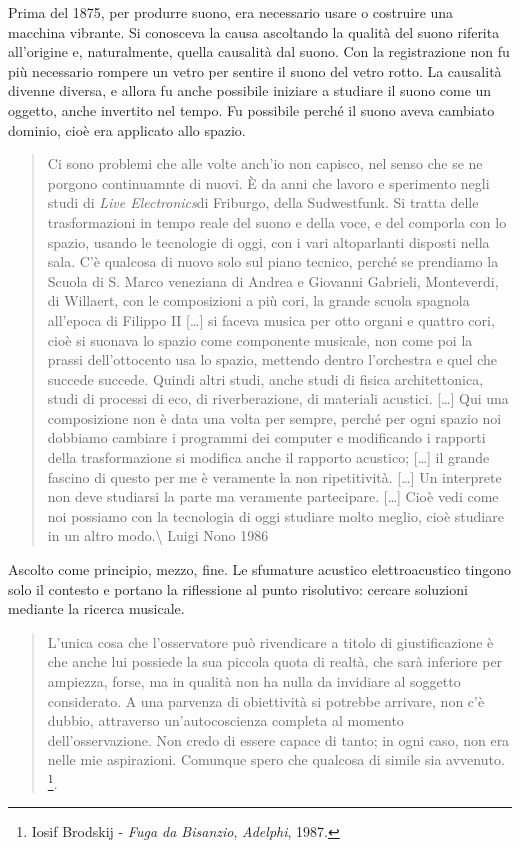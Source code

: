 \documentclass[a4paper,11pt]{article}
\begin{document}
Prima del 1875, per produrre suono, era necessario usare o costruire una
macchina vibrante. Si conosceva la causa ascoltando la qualità del suono
riferita all'origine e, naturalmente, quella causalità dal suono. Con la
registrazione non fu più necessario rompere un vetro per sentire il
suono del vetro rotto. La causalità divenne diversa, e allora fu anche
possibile iniziare a studiare il suono come un oggetto, anche invertito
nel tempo. Fu possibile perché il suono aveva cambiato dominio, cioè era
applicato allo spazio.

\begin{quote}
Ci sono problemi che alle volte anch'io non capisco, nel senso che se
ne porgono continuamnte di nuovi. È da anni che lavoro e sperimento
negli studi di \emph{Live Electronics}di Friburgo, della Sudwestfunk. Si
tratta delle trasformazioni in tempo reale del suono e della voce, e
del comporla con lo spazio, usando le tecnologie di oggi, con i vari
altoparlanti disposti nella sala. C'è qualcosa di nuovo solo sul piano
tecnico, perché se prendiamo la Scuola di S. Marco veneziana di Andrea
e Giovanni Gabrieli, Monteverdi, di Willaert, con le composizioni a
più cori, la grande scuola spagnola all'epoca di Filippo II {[}\ldots{}{]} si
faceva musica per otto organi e quattro cori, cioè si suonava lo
spazio come componente musicale, non come poi la prassi dell'ottocento
usa lo spazio, mettendo dentro l'orchestra e quel che succede succede.
Quindi altri studi, anche studi di fisica architettonica, studi di
processi di eco, di riverberazione, di materiali acustici. {[}\ldots{}{]} Qui
una composizione non è data una volta per sempre, perché per ogni
spazio noi dobbiamo cambiare i programmi dei computer e modificando i
rapporti della trasformazione si modifica anche il rapporto acustico;
{[}\ldots{}{]} il grande fascino di questo per me è veramente la non
ripetitività. {[}\ldots{}{]} Un interprete non deve studiarsi la parte ma
veramente partecipare. {[}\ldots{}{]} Cioè vedi come noi possiamo con la
tecnologia di oggi studiare molto meglio, cioè studiare in un altro
modo.\textbackslash{}
Luigi Nono 1986
\end{quote}

Ascolto come principio, mezzo, fine. Le sfumature acustico
elettroacustico tingono solo il contesto e portano la riflessione al
punto risolutivo: cercare soluzioni mediante la ricerca musicale.

\begin{quote}
L'unica cosa che l'osservatore può rivendicare a titolo di
giustificazione è che anche lui possiede la sua piccola quota di
realtà, che sarà inferiore per ampiezza, forse, ma in qualità non ha
nulla da invidiare al soggetto considerato. A una parvenza di
obiettività si potrebbe arrivare, non c'è dubbio, attraverso
un'autocoscienza completa al momento dell'osservazione. Non credo di
essere capace di tanto; in ogni caso, non era nelle mie aspirazioni.
Comunque spero che qualcosa di simile sia avvenuto. \footnote{Iosif Brodskij - \emph{Fuga da Bisanzio}, \emph{Adelphi}, 1987.}.
\end{quote}
\end{document}
